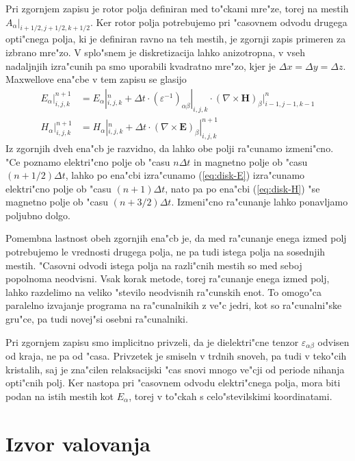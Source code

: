 \documentclass[12pt,twoside,openright,final,a4paper]{report}
\renewcommand{\vec}{\mathbf}
\begin{document}
Pri zgornjem zapisu je rotor polja definiran med to"ckami mre"ze, torej na mestih $A_\alpha|_{i+1/2,j+1/2,k+1/2}$. 
Ker rotor polja potrebujemo pri "casovnem odvodu drugega opti"cnega polja, ki je definiran ravno na teh mestih, je zgornji zapis primeren za izbrano mre"zo. 
V splo"snem je diskretizacija lahko anizotropna, v vseh nadaljnjih izra"cunih pa smo uporabili kvadratno mre"zo, kjer je $\Delta x = \Delta y = \Delta z$. 
Maxwellove ena"cbe v tem zapisu se glasijo
\begin{align}
 E_\alpha|_{i,j,k}^{n+1} &= E_\alpha|_{i,j,k}^n + \Delta t \cdot (\varepsilon^{-1})_{\alpha\beta}|_{i,j,k} \cdot (\nabla\times \vec H)_\beta|_{i-1,j-1,k-1}^{n} \label{eq:disk-E}\\
 H_\alpha|_{i,j,k}^{n+1} &= H_\alpha|_{i,j,k}^n + \Delta t \cdot (\nabla\times \vec E)_\beta|_{i,j,k}^{n+1} \label{eq:disk-H}
\end{align}
Iz zgornjih dveh ena"cb je razvidno, da lahko obe polji ra"cunamo izmeni"cno. 
"Ce poznamo elektri"cno polje ob "casu $n\Delta t$ in magnetno polje ob "casu $(n+1/2)\Delta t$, lahko po ena"cbi izra"cunamo (\ref{eq:disk-E}) izra"cunamo elektri"cno polje ob "casu $(n+1)\Delta t$, nato pa po ena"cbi (\ref{eq:disk-H}) "se magnetno polje ob "casu $(n+3/2)\Delta t$. Izmeni"cno ra"cunanje lahko ponavljamo poljubno dolgo. 

Pomembna lastnost obeh zgornjih ena"cb je, da med ra"cunanje enega izmed polj potrebujemo le vrednosti drugega polja, ne pa tudi istega polja na sosednjih mestih. 
"Casovni odvodi istega polja na razli"cnih mestih so med seboj popolnoma neodvisni. 
Vsak korak metode, torej ra"cunanje enega izmed polj, lahko razdelimo na veliko "stevilo neodvisnih ra"cunskih enot. 
To omogo"ca paralelno izvajanje programa na ra"cunalnikih z ve"c jedri, kot so ra"cunalni"ske gru"ce, pa tudi novej"si osebni ra"cunalniki. 

Pri zgornjem zapisu smo implicitno privzeli, da je dielektri"cne tenzor $\varepsilon_{\alpha\beta}$ odvisen od kraja, ne pa od "casa. 
Privzetek je smiseln v trdnih snoveh, pa tudi v teko"cih kristalih, saj je zna"cilen relaksacijski "cas snovi mnogo ve"cji od periode nihanja opti"cnih polj. 
Ker nastopa pri "casovnem odvodu elektri"cnega polja, mora biti podan na istih mestih kot $E_\alpha$, torej v to"ckah s celo"stevilskimi koordinatami. 

\section{Izvor valovanja}
\end{document}
